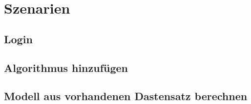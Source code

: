 \section{Szenarien} %
\subsection{Login}


\subsection{Algorithmus hinzufügen}


\subsection{Modell aus vorhandenen Dastensatz berechnen}

